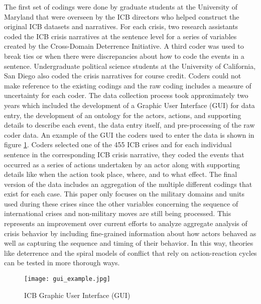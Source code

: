 \documentclass[12pt,letterpaper]{article}
\begin{document}
The first set of codings were done by graduate students at the University of Maryland that were overseen by the ICB directors who helped construct the original ICB datasets and narratives. For each crisis, two research assistants coded the ICB crisis narratives at the sentence level for a series of variables created by the Cross-Domain Deterrence Initiative. A third coder was used to break ties or when there were discrepancies about how to code the events in a sentence. Undergraduate political science students at the University of California, San Diego also coded the crisis narratives for course credit. Coders could not make reference to the existing codings and the raw coding includes a measure of uncertainty for each coder. The data collection process took approximately two years which included the development of a Graphic User Interface (GUI) for data entry, the development of an ontology for the actors, actions, and supporting details to describe each event, the data entry itself, and pre-processing of the raw coder data. An example of the GUI the coders used to enter the data is shown in figure \ref{fig:coding_gui}. Coders selected one of the 455 ICB crises and for each individual sentence in the corresponding ICB crisis narrative, they coded the events that occurred as a series of actions undertaken by an actor along with supporting details like when the action took place, where, and to what effect. The final version of the data includes an aggregation of the multiple different codings that exist for each case. This paper only focuses on the military domains and units used during these crises since the other variables concerning the sequence of international crises and non-military moves are still being processed. This represents an improvement over current efforts to analyze aggregate analysis of crisis behavior by including fine-grained information about how actors behaved as well as capturing the sequence and timing of their behavior. In this way, theories like deterrence and the spiral models of conflict that rely on action-reaction cycles can be tested in more thorough ways.

\begin{figure}[h]
	\centering
	\texttt{[image: gui\_example.jpg]}
	\caption{ICB Graphic User Interface (GUI)}
	\label{fig:coding_gui}
\end{figure} 
\end{document}

